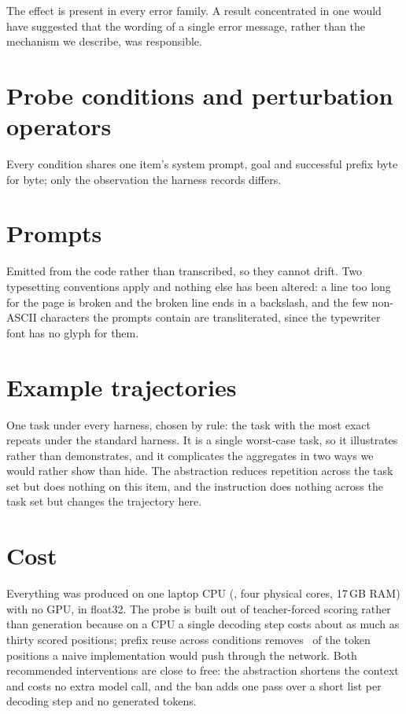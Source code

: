 The effect is present in every error family. A result concentrated in one would
have suggested that the wording of a single error message, rather than the
mechanism we describe, was responsible.



\section{Probe conditions and perturbation operators}
\label{app:ws-conditions}

Every condition shares one item's system prompt, goal and successful prefix
byte for byte; only the observation the harness records differs.





\section{Prompts}
\label{app:ws-prompts}

Emitted from the code rather than transcribed, so they cannot drift. Two
typesetting conventions apply and nothing else has been altered: a line too
long for the page is broken and the broken line ends in a backslash, and the
few non-ASCII characters the prompts contain are transliterated, since the
typewriter font has no glyph for them.



\section{Example trajectories}
\label{app:ws-traj}

One task under every harness, chosen by rule: the task with the most exact
repeats under the standard harness. It is a single worst-case task, so it
illustrates rather than demonstrates, and it complicates the aggregates in two
ways we would rather show than hide. The abstraction reduces repetition across
the task set but does nothing on this item, and the instruction does nothing
across the task set but changes the trajectory here.



\section{Cost}
\label{app:ws-cost}

Everything was produced on one laptop CPU (\CPUName, four physical cores,
17\,GB RAM) with no GPU, in float32. The probe is built out of teacher-forced
scoring rather than generation because on a CPU a single decoding step costs
about as much as thirty scored positions; prefix reuse across conditions
removes \CacheSaving\ of the token positions a naive implementation would push
through the network. Both recommended interventions are close to free: the
abstraction shortens the context and costs no extra model call, and the ban
adds one pass over a short list per decoding step and no generated tokens.


